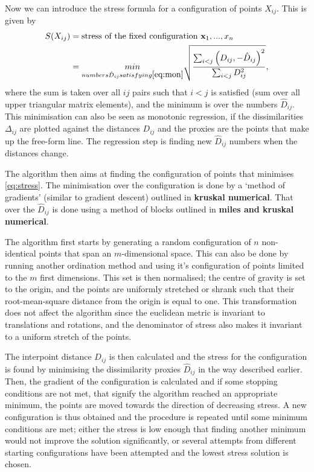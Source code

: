 Now we can introduce the stress formula for a configuration of points $X_{ij}$. This is given by
\begin{align}
	S(X_{ij})&= \text{stress of the fixed configuration } { \mathbf x_1, ...,x_n}\\
	 &=\underset{numbers \hat{D}_{ij} satisfying \eqref{eq:mon}}{ min}
	 \sqrt{\frac{\sum_{i<j}\left(D_{ij},-\hat{D}_{i j}\right)^{2}}{\sum_{i<j} D_{i j}^{2}}},
	 \label{eq:stress}
\end{align}
where the sum is taken over all $ij$ pairs such that $i<j$ is satisfied (sum over all upper triangular matrix elements), and the minimum is over the numbers $\hat{D}_{ij}$. This minimisation can also be seen as monotonic regression, if the dissimilarities $\Delta_{ij}$ are plotted against the distances $D_{ij}$ and the proxies are the points that make up the free-form line. The regression step is finding new $\hat{D}_{ij}$ numbers when the distances change. 

The algorithm then aims at finding the configuration of points that minimises \eqref{eq:stress}. The minimisation over the configuration is done by a `method of gradients' (similar to gradient descent) outlined in \textbf{kruskal numerical}. That over the $\hat{D}_{ij}$ is done using a method of blocks outlined in \textbf{miles and kruskal numerical}.


The algorithm first starts by generating a random configuration of $n$ non-identical points that span an $m$-dimensional space. This can also be done by running another ordination method and using it's configuration of points limited to the $m$ first dimensions. This set is then normalised; the centre of gravity is set to the origin, and the points are uniformly stretched or shrank such that their root-mean-square distance from the origin is equal to one. This transformation does not affect the algorithm since the euclidean metric is invariant to translations and rotations, and the denominator of stress also makes it invariant to a uniform stretch of the points. 

 The interpoint distance $D_{ij}$ is then calculated and the stress for the configuration is found by minimising the dissimilarity proxies  $\hat{D}_{ij}$ in the way described earlier. Then, the gradient of the configuration is calculated and if some stopping conditions are not met, that signify the algorithm reached an appropriate minimum, the points are moved towards the direction of decreasing stress. A new configuration is thus obtained and the procedure is repeated until some minimum conditions are met; either the stress is low enough that finding another minimum would not improve the solution significantly, or several attempts from different starting configurations have been attempted and the lowest stress solution is chosen. 

